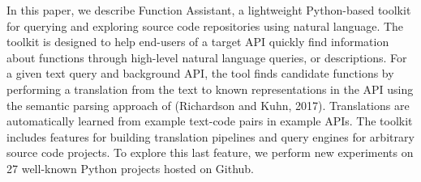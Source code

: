 In this paper, we describe Function Assistant, a lightweight Python-based toolkit for querying and exploring source code repositories using natural language. The toolkit is designed to help end-users of a target API quickly find information about functions through high-level natural language queries, or descriptions. For a given text query and background API, the tool finds candidate functions by performing a translation from the text to known representations in the API using the semantic parsing approach of (Richardson and Kuhn, 2017). Translations are automatically learned from example text-code pairs in example APIs. The toolkit includes features for building translation pipelines and query engines for arbitrary source code projects. To explore this last feature, we perform new experiments on 27 well-known Python projects hosted on Github.

